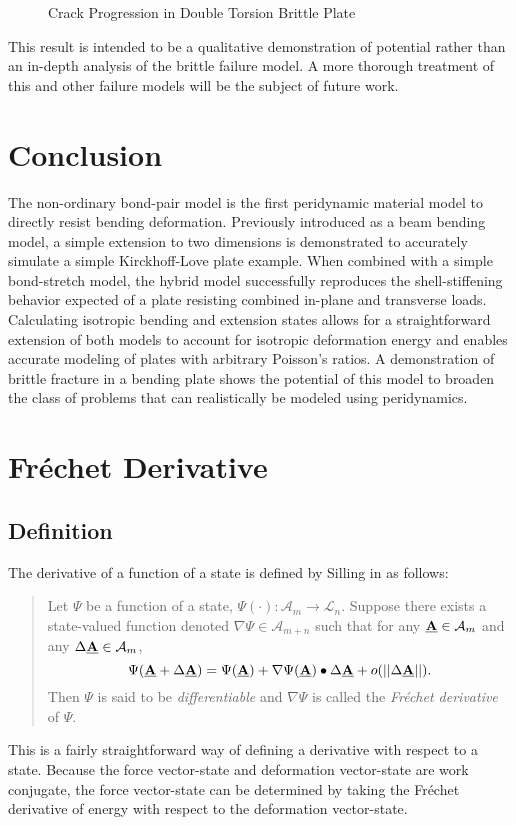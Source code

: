 \documentclass[preprint,review,12pt]{elsarticle}
\newcommand{\plotpath}{./plots}
\newcommand\vstate[3]{%
	\mathbf{\underline{#1}}%
	\ifstrempty{#2}{}{[#2]}%
	\ifstrempty{#3}{}{\langle #3 \rangle}}
\begin{document}
%
\begin{figure}[tbp]
  \centering
  \resizebox{0.6\linewidth}{!}{}
  \caption{Crack Progression in Double Torsion Brittle Plate}
  \label{fig:DTdamage}
\end{figure}
%

This result is intended to be a qualitative demonstration of potential rather than an in-depth analysis of the brittle failure model. A more thorough treatment of this and other failure models will be the subject of future work. 

\section{Conclusion}
The non-ordinary bond-pair model is the first peridynamic material model to directly resist bending deformation.  Previously introduced as a beam bending model, a simple extension to two dimensions is demonstrated to accurately simulate a simple Kirckhoff-Love plate example.  When combined with a simple bond-stretch model, the hybrid model successfully reproduces the shell-stiffening behavior expected of a plate resisting combined in-plane and transverse loads.  Calculating isotropic bending and extension states allows for a straightforward extension of both models to account for isotropic deformation energy and enables accurate modeling of plates with arbitrary Poisson's ratios.  A demonstration of brittle fracture in a bending plate shows the potential of this model to broaden the class of problems that can realistically be modeled using peridynamics.

\appendix
\section{Fr\'echet Derivative}
\label{sec:frechet}
\subsection{Definition}
The derivative of a function of a state is defined by Silling in \cite{silling2007peridynamic} as follows:
\begin{quote}
Let $\Psi$ be a function of a state, $\Psi(\cdot):\mathcal{A}_m\rightarrow\mathcal{L}_n$. Suppose there exists a state-valued function denoted $\nabla\Psi\in\mathcal{A}_{m+n}$ such that for any $\vstate{A}{}{}\in\mathcal{A}_m$ and any $\Delta\vstate{A}{}{}\in\mathcal{A}_m$,
\begin{equation}
  \Psi(\vstate{A}{}{}+\Delta\vstate{A}{}{})=\Psi(\vstate{A}{}{})+\nabla\Psi(\vstate{A}{}{})\bullet\Delta\vstate{A}{}{}+o(||\Delta\vstate{A}{}{}||).
\end{equation}
Then $\Psi$ is said to be \textit{differentiable} and $\nabla\Psi$ is called the \textit{Fr\'echet derivative} of $\Psi$.
\end{quote}
This is a fairly straightforward way of defining a derivative with respect to a state.
Because the force vector-state and deformation vector-state are work conjugate, the force vector-state can be determined by taking the Fr\'echet derivative of energy with respect to the deformation vector-state.
\end{document}
